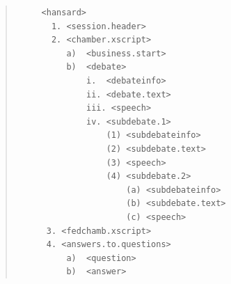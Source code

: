 \documentclass[
  letterpaper,
  DIV=11,
  numbers=noendperiod]{scrartcl}
\begin{document}
\begin{quote}
\begin{verbatim}
     <hansard>
       1. <session.header>
       2. <chamber.xscript>
          a)  <business.start>
          b)  <debate>
              i.  <debateinfo>
              ii. <debate.text>
              iii. <speech>
              iv. <subdebate.1>
                  (1) <subdebateinfo>
                  (2) <subdebate.text>
                  (3) <speech>
                  (4) <subdebate.2>
                      (a) <subdebateinfo>
                      (b) <subdebate.text>
                      (c) <speech>
      3. <fedchamb.xscript>
      4. <answers.to.questions>
          a)  <question>
          b)  <answer>
\end{verbatim}
\end{quote}
\end{document}

